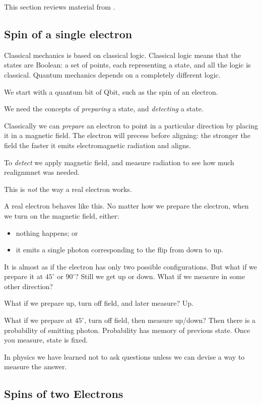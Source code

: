 \documentclass[]{article}
\begin{document}
This section reviews material from \cite{susskind2013quantum}.
\subsection{Spin of a single electron}

Classical mechanics is based on classical logic. Classical logic means that the states are Boolean: a set of points, each representing a state, and all the logic is classical. Quantum mechanics depends on a completely different logic.

We start with a quantum bit of Qbit, such as the spin of an electron.

We need the concepts of \emph{preparing} a state, and \emph{detecting} a state.

Classically we can \emph{prepare} an electron to point in a particular direction by placing it in a magnetic field. The electron will precess before aligning: the stronger the field the faster it emits electromagnetic radiation and aligns.

To \emph{detect} we apply magnetic field, and measure radiation to see how much realignmnet was needed.

This is \emph{not} the way a real electron works.

A real electron behaves like this. No matter how we prepare the electron, when we turn on the magnetic field, either:
\begin{itemize}
	\item nothing happens; or
	\item it emits a single photon corresponding to the flip from down to up.
\end{itemize}
It is almost as if the electron has only two possible configurations. But what if we prepare it at $45^\circ$ or $90^\circ$? Still we get up or down. What if we measure in some other direction?

What if we prepare up, turn off field, and later measure? Up.

What if we prepare at $45^\circ$, turn off field, then measure up/down? Then there is a probability of emitting photon. Probability has memory of previous state. Once you measure, state is fixed.

In physics we have learned not to ask questions unless we can devise a way to measure the answer.


\subsection{Spins of two Electrons}
\end{document}
